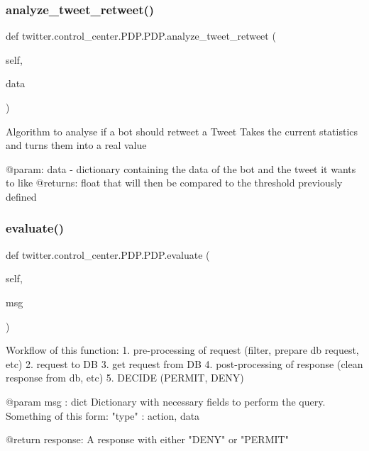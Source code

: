 \subsubsection{\texorpdfstring{analyze\+\_\+tweet\+\_\+retweet()}{analyze\_tweet\_retweet()}}
{\footnotesize\ttfamily def twitter.\+control\+\_\+center.\+P\+D\+P.\+P\+D\+P.\+analyze\+\_\+tweet\+\_\+retweet (\begin{DoxyParamCaption}\item[{}]{self,  }\item[{}]{data }\end{DoxyParamCaption})}

\begin{DoxyVerb}Algorithm to analyse if a bot should retweet a Tweet
Takes the current statistics and turns them into a real value

@param: data - dictionary containing the data of the bot and the tweet it wants to like
@returns: float that will then be compared to the threshold previously defined
\end{DoxyVerb}
 \mbox{\label{classtwitter_1_1control__center_1_1PDP_1_1PDP_ad40264a760a1bdcb7563cb71955bb7f9}} 
\subsubsection{\texorpdfstring{evaluate()}{evaluate()}}
{\footnotesize\ttfamily def twitter.\+control\+\_\+center.\+P\+D\+P.\+P\+D\+P.\+evaluate (\begin{DoxyParamCaption}\item[{}]{self,  }\item[{}]{msg }\end{DoxyParamCaption})}

\begin{DoxyVerb}Workflow of this function:
    1. pre-processing of request (filter, prepare db request, etc)
    2. request to DB
    3. get request from DB
    4. post-processing of response (clean response from db, etc)
    5. DECIDE (PERMIT, DENY)

@param msg : dict
    Dictionary with necessary fields to perform the query.
    Something of this form: { "type" : action, data }

@return response:
    A response with either "DENY" or "PERMIT"
\end{DoxyVerb}
 \mbox{\label{classtwitter_1_1control__center_1_1PDP_1_1PDP_a5ac3bf5edb6f1913f09aecf0fe1ccc7f}} 
